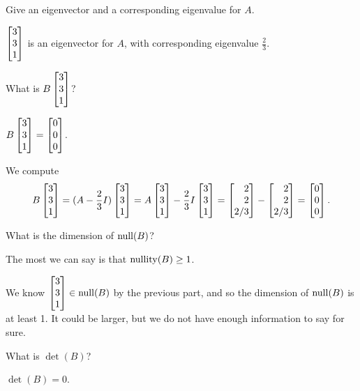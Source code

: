 \documentclass{problemset}
\begin{document}
	\begin{parts}
		\item Give an eigenvector and a corresponding eigenvalue for $A$.
			\begin{solution}
				$\mat{3\\3\\1}$ is an eigenvector for $A$, with corresponding
				eigenvalue $\frac{2}{3}$.
			\end{solution}
		\item What is $B\mat{3\\3\\1}$?
			\begin{solution}
				$B\mat{3\\3\\1}=\mat{0\\0\\0}$.

				We compute
				\[
					B\mat{3\\3\\1}
					=(A-\frac{2}{3}I)\mat{3\\3\\1}
					=A\mat{3\\3\\1} - \frac{2}{3}I\mat{3\\3\\1}
					=\mat{2\\2\\2/3} - \mat{2\\2\\2/3}
					=\mat{0\\0\\0}.
				\]
			\end{solution}
		\item What is the dimension of $\operatorname{null}(B)$?
			\begin{solution}
				The most we can say is that $\operatorname{nullity}(B)\geq1$.

				We know $\mat{3\\3\\1}\in\Null(B)$ by the previous part, and so
				the dimension of $\operatorname{null}(B)$ is at least 1. It could be larger, but
				we do not have enough information to say for sure.
			\end{solution}
		\item What is $\det(B)$?
			\begin{solution}[inline]
				$\det(B)=0$.
			\end{solution}
	\end{parts}
\end{document}
